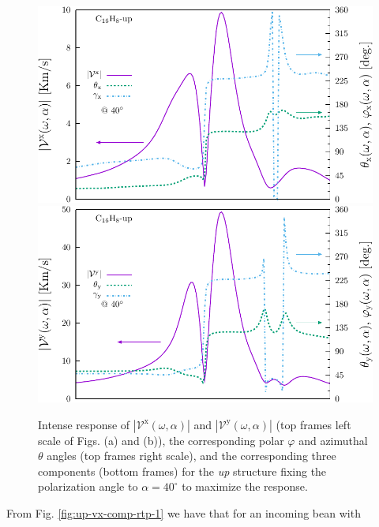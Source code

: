\documentclass[prb,11pt,tightenlines,twocolumn,aps]{revtex4-1}
\begin{document}
\begin{figure}[t]
    \centering
    \includegraphics[width=\linewidth]{upplots/up-vxb-rtp-m2}
    \label{fig:up-vx-comp-rtp-2}
    \\
    \includegraphics[width=\linewidth]{upplots/up-vyb-rtp-m2}
    \label{fig:up-vy-comp-rtp-2}
    
    \caption{Intense response of
    $|\mathcal{V}^{\mathrm{x}}(\omega,\alpha)|$ and
    $|\mathcal{V}^{\mathrm{y}}(\omega,\alpha)|$ (top frames left scale of Figs.
    (a) and (b)), the corresponding polar $\varphi$ and azimuthal $\theta$
    angles (top frames right scale), and the corresponding three components
    (bottom frames) for the \emph{up} structure fixing the polarization angle to
    $\alpha=40^{\circ}$ to maximize the response.}

    \label{fig:up-vab-comp-rtp-2}
\end{figure}
From Fig. \ref{fig:up-vx-comp-rtp-1} we have that for an incoming bean with
\end{document}
